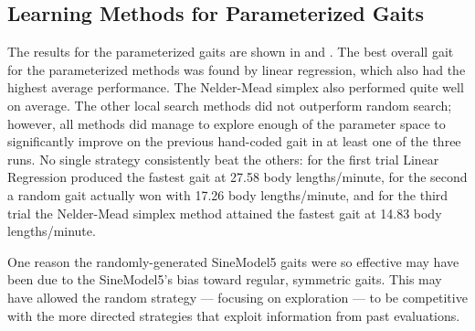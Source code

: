 


\subsection{Learning Methods for Parameterized Gaits}


The results for the parameterized gaits are shown in
 and .  The best overall gait for
the parameterized methods was found by linear regression, which also
had the highest average performance. The Nelder-Mead simplex also
performed quite well on average.  The other local search methods did not
outperform random search; however, all methods did manage to explore
enough of the parameter space to significantly improve on the previous
hand-coded gait in at least one of the three runs.  No single strategy
consistently beat the others: for the first trial Linear Regression
produced the fastest gait at 27.58 body lengths/minute, for the second
a random gait actually won with 17.26 body lengths/minute, and for the
third trial the Nelder-Mead simplex method attained the fastest gait
at 14.83 body lengths/minute.

One reason the randomly-generated SineModel5 gaits were so effective
may have been due to the SineModel5's bias toward regular, symmetric
gaits.  This may have allowed the random strategy --- focusing on
exploration --- to be competitive with the more directed strategies
that exploit information from past evaluations.



% 
% 
% 


